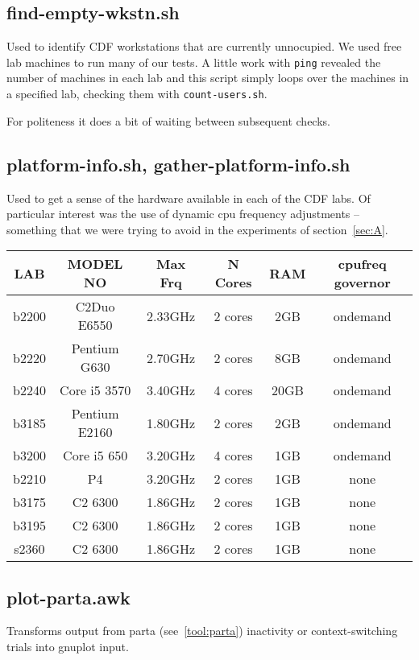 \documentclass{article}
\begin{document}
\subsection{find-empty-wkstn.sh} \label{tool:find-empty}
Used to identify CDF workstations that are currently unnocupied. We used free
lab machines to run many of our tests. A little work with \lstinline{ping}
revealed the number of machines in each lab and this script simply loops over
the machines in a specified lab, checking them with \lstinline{count-users.sh}.

For politeness it does a bit of waiting between subsequent checks.

\subsection{platform-info.sh, gather-platform-info.sh} \label{tool:platform}
Used to get a sense of the hardware available in each of the CDF labs. Of
particular interest was the use of dynamic cpu frequency adjustments --
something that we were trying to avoid in the experiments of
section~\ref{sec:A}.

\begin{center}
    \begin{tabular}{ | c | c | c | c | c | c |}
    \hline
    LAB   & MODEL NO      & Max Frq & N Cores & RAM  & cpufreq governor \\
    \hline 
    b2200 & C2Duo E6550   & 2.33GHz & 2 cores &  2GB & ondemand \\
    b2220 & Pentium G630  & 2.70GHz & 2 cores &  8GB & ondemand \\
    b2240 & Core i5 3570  & 3.40GHz & 4 cores & 20GB & ondemand \\
    b3185 & Pentium E2160 & 1.80GHz & 2 cores &  2GB & ondemand \\
    b3200 & Core i5 650   & 3.20GHz & 4 cores &  1GB & ondemand \\
    \hline
    b2210 & P4            & 3.20GHz & 2 cores &  1GB & none \\
    b3175 & C2 6300       & 1.86GHz & 2 cores &  1GB & none \\
    b3195 & C2 6300       & 1.86GHz & 2 cores &  1GB & none \\
    s2360 & C2 6300       & 1.86GHz & 2 cores &  1GB & none \\
    \hline
\end{tabular}
\end{center}

\subsection{plot-parta.awk}
Transforms output from parta (see~\ref{tool:parta}) inactivity or 
context-switching trials into gnuplot input.
\end{document}
